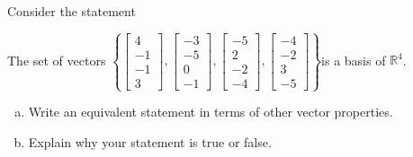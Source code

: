 
\begin{exerciseStatement}


Consider the statement 
\begin{center}\begin{minipage}{0.8\textwidth}
 The set of vectors \( \left\{ \left[\begin{array}{c}
4 \\
-1 \\
-1 \\
3
\end{array}\right] , \left[\begin{array}{c}
-3 \\
-5 \\
0 \\
-1
\end{array}\right] , \left[\begin{array}{c}
-5 \\
2 \\
-2 \\
-4
\end{array}\right] , \left[\begin{array}{c}
-4 \\
-2 \\
3 \\
-5
\end{array}\right] \right\} \)is a basis of \(\mathbb{R}^4\). 
\end{minipage}\end{center}
    


\begin{enumerate}[(a)]
\item  Write an equivalent statement in terms of other vector properties.
\item  Explain why your statement is true or false.
\end{enumerate}
    
\end{exerciseStatement}
    
